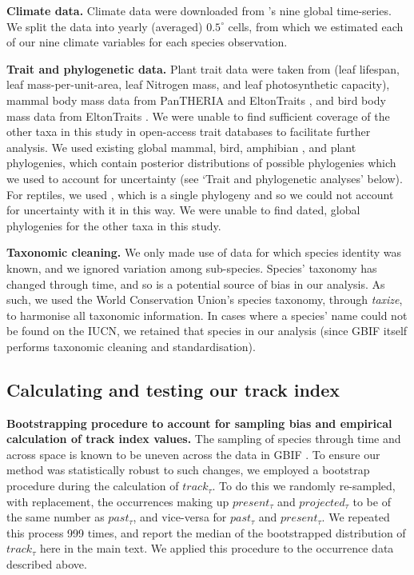 \documentclass[12pt]{report}
\begin{document}
\textbf{Climate data.} Climate data were downloaded from
\citeauthor{Harris2014}\supercite{Harris2014}'s nine global
time-series. We split the data into yearly (averaged) $0.5^\circ$
cells, from which we estimated each of our nine climate variables for
each species observation.

\textbf{Trait and phylogenetic data.} Plant trait data were taken from
\citeauthor{Wright2004}\supercite{Wright2004} (leaf lifespan, leaf
mass-per-unit-area, leaf Nitrogen mass, and leaf photosynthetic
capacity), mammal body mass data from PanTHERIA\supercite{Jones2009a}
and EltonTraits \supercite{Wilman2014}, and bird body mass data from
EltonTraits \supercite{Wilman2014}. We were unable to find sufficient
coverage of the other taxa in this study in open-access trait
databases to facilitate further analysis. We used existing global
mammal\supercite{Faurby2015}, bird\supercite{Jetz2012}, amphibian
\supercite{Jetz2018}, and plant\supercite{Smith2018} phylogenies,
which contain posterior distributions of possible phylogenies which we
used to account for uncertainty (see `Trait and phylogenetic analyses'
below). For reptiles, we used
\citeauthor{Zheng2016}\supercite{Zheng2016}, which is a single
phylogeny and so we could not account for uncertainty with it in this
way. We were unable to find dated, global phylogenies for the other
taxa in this study.

\textbf{Taxonomic cleaning.}  We only made use of data for which
species identity was known, and we ignored variation among
sub-species. Species' taxonomy has changed through time, and so is a
potential source of bias in our analysis. As such, we used the World
Conservation Union's species taxonomy, through
\emph{taxize}\supercite{Chamberlain2013}, to harmonise all taxonomic
information. In cases where a species' name could not be found on the
IUCN, we retained that species in our analysis (since GBIF itself
performs taxonomic cleaning and standardisation).

\subsection*{Calculating and testing our track index}

\textbf{Bootstrapping procedure to account for sampling bias and
  empirical calculation of track index values.}  The sampling of
species through time and across space is known to be uneven across the
data in GBIF \supercite{Beck2013,Beck2014}. To ensure our method was
statistically robust to such changes, we employed a bootstrap
procedure during the calculation of $track_\tau$. To do this we
randomly re-sampled, with replacement, the occurrences making up
$present_\tau$ and $projected_\tau$ to be of the same number as
$past_\tau$, and vice-versa for $past_\tau$ and $present_\tau$. We
repeated this process 999 times, and report the median of the
bootstrapped distribution of $track_\tau$ here in the main text. We
applied this procedure to the occurrence data described above.
\end{document}
